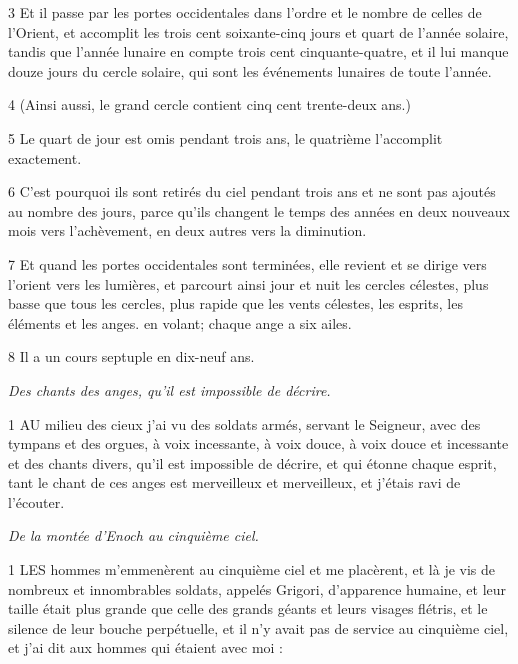 \par 3 Et il passe par les portes occidentales dans l'ordre et le nombre de celles de l'Orient, et accomplit les trois cent soixante-cinq jours et quart de l'année solaire, tandis que l'année lunaire en compte trois cent cinquante-quatre, et il lui manque douze jours du cercle solaire, qui sont les événements lunaires de toute l'année.

\par 4 (Ainsi aussi, le grand cercle contient cinq cent trente-deux ans.)

\par 5 Le quart de jour est omis pendant trois ans, le quatrième l'accomplit exactement.

\par 6 C'est pourquoi ils sont retirés du ciel pendant trois ans et ne sont pas ajoutés au nombre des jours, parce qu'ils changent le temps des années en deux nouveaux mois vers l'achèvement, en deux autres vers la diminution.

\par 7 Et quand les portes occidentales sont terminées, elle revient et se dirige vers l'orient vers les lumières, et parcourt ainsi jour et nuit les cercles célestes, plus basse que tous les cercles, plus rapide que les vents célestes, les esprits, les éléments et les anges. en volant; chaque ange a six ailes.

\par 8 Il a un cours septuple en dix-neuf ans.


\par \textit{Des chants des anges, qu'il est impossible de décrire.}

\par 1 AU milieu des cieux j'ai vu des soldats armés, servant le Seigneur, avec des tympans et des orgues, à voix incessante, à voix douce, à voix douce et incessante et des chants divers, qu'il est impossible de décrire, et qui étonne chaque esprit, tant le chant de ces anges est merveilleux et merveilleux, et j'étais ravi de l'écouter.


\par \textit{De la montée d'Enoch au cinquième ciel.}

\par 1 LES hommes m'emmenèrent au cinquième ciel et me placèrent, et là je vis de nombreux et innombrables soldats, appelés Grigori, d'apparence humaine, et leur taille était plus grande que celle des grands géants et leurs visages flétris, et le silence de leur bouche perpétuelle, et il n'y avait pas de service au cinquième ciel, et j'ai dit aux hommes qui étaient avec moi :

